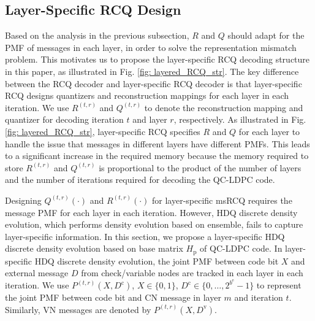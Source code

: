 \documentclass [PhD] {uclathes}
\begin{document}
\subsection{Layer-Specific RCQ Design}
Based on the analysis in the previous subsection,  $R$ and $Q$ should adapt for the PMF of messages in each layer, in order to solve the representation mismatch problem. This motivates us to propose the layer-specific RCQ decoding structure in this paper, as illustrated in Fig. \ref{fig: layered_RCQ_str}. The key difference between the RCQ decoder and layer-specific RCQ decoder is that layer-specific RCQ designs quantizers and reconstruction mappings for each layer in each iteration.  We use $R^{(t,r)}$ and $Q^{(t,r)}$ to denote the reconstruction mapping and quantizer for decoding iteration $t$ and layer $r$, respectively. 
As illustrated in Fig. \ref{fig: layered_RCQ_str}, layer-specific RCQ specifies $R$ and $Q$ for each layer to handle the issue that messages in different layers have different PMFs. This leads to a significant increase in the required memory because the memory required to store $R^{(t,r)}$ and $Q^{(t,r)}$ is proportional to the product of the number of layers and the number of iterations required for decoding the QC-LDPC code.

Designing $Q^{(t,r)}(\cdot)$ and $R^{(t,r)}(\cdot)$ for layer-specific msRCQ requires the message PMF for each layer in each iteration.  However, HDQ discrete density evolution\cite{Wang2020-RCQ}, which performs density evolution based on ensemble, fails to capture layer-specific information. In this section, we propose a layer-specific HDQ discrete density evolution based on base matrix $H_\text{p}$ of QC-LDPC code. In layer-specific HDQ discrete density evolution, the joint PMF between code bit $X$ and external message $D$ from check/variable nodes are tracked in each layer in each iteration. We use $P^{(t,r)}(X,D^\text{c})$, $X\in\{0,1\}$, $D^\text{c}\in\{0,\ldots,2^{b^\text{e}}-1\}$ to represent the joint PMF between code bit and CN message in layer $m$ and iteration $t$. Similarly, VN messages are denoted by $P^{(t,r)}(X,D^\text{v})$.
\end{document}
